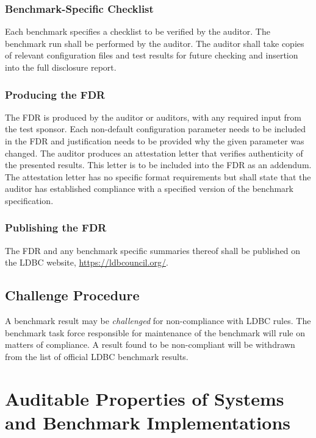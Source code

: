\subsubsection{Benchmark-Specific Checklist}
Each benchmark specifies a checklist to be verified by the auditor. The benchmark run shall be performed by the auditor. The auditor shall take copies of relevant configuration files and test results for future checking and insertion into the full disclosure report.

\subsubsection{Producing the FDR}
The FDR is produced by the auditor or auditors, with any required input from the test sponsor. Each non-default configuration parameter needs to be included in the FDR and justification needs to be provided why the given parameter was changed.
The auditor produces an attestation letter that verifies authenticity of the presented results. This letter is to be included into the FDR as an addendum. The attestation letter has no specific format requirements but shall state that the auditor has established compliance with a specified version of the benchmark specification.

\subsubsection{Publishing the FDR}
The FDR and any benchmark specific summaries thereof shall be published on the LDBC website, \url{https://ldbcouncil.org/}.

\subsection{Challenge Procedure}

A benchmark result may be \emph{challenged} for non-compliance with LDBC rules. The benchmark task force responsible for maintenance of the benchmark will rule on matters of compliance. A result found to be non-compliant will be withdrawn from the list of official LDBC benchmark results.


\section{Auditable Properties of Systems and Benchmark Implementations}

